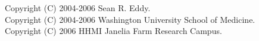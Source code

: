 \vspace*{\fill}
\begin{flushleft}
Copyright (C) 2004-2006 Sean R. Eddy.\\
Copyright (C) 2004-2006 Washington University School of Medicine.\\
Copyright (C) 2006 HHMI Janelia Farm Research Campus.\\
\end{flushleft}


